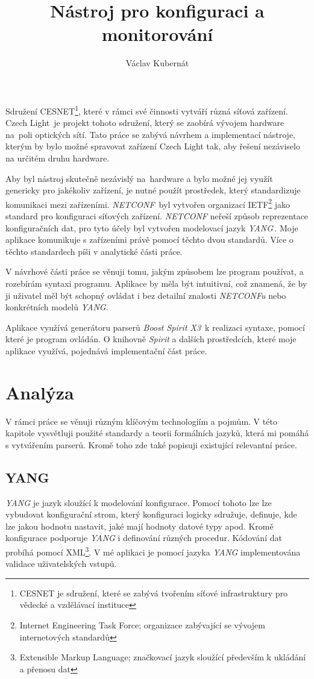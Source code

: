 \documentclass[thesis=B,czech,hidelinks]{FITthesis}[2019/03/06]
\title{Nástroj pro konfiguraci a monitorování}
\author{Václav Kubernát}
\begin{document}
\begin{introduction}
Sdružení CESNET\footnote{CESNET je sdružení, které se zabývá tvořením síťové infrastruktury pro vědecké a vzdělávací instituce}, které v rámci své činnosti vytváří různá síťová zařízení. Czech Light\,\cite{czechlight} je projekt tohoto sdružení, který se zaobírá vývojem hardware na~poli optických sítí. Tato práce se zabývá návrhem a implementací nástroje, kterým by bylo možné spravovat zařízení Czech Light tak, aby řešení nezáviselo na určitém druhu hardware.

Aby byl nástroj skutečně nezávislý na~hardware a bylo možné jej využít genericky pro jakékoliv zařízení, je nutné použít prostředek, který standardizuje komunikaci mezi zařízeními. \textit{NETCONF}\,\cite{rfcNetconf} byl vytvořen organizací IETF\footnote{Internet Engineering Task Force; organizace zabývající se vývojem internetových standardů} jako standard pro konfiguraci síťových zařízení. \textit{NETCONF} neřeší způsob reprezentace konfiguračních dat, pro tyto účely byl vytvořen modelovací jazyk \textit{YANG}\,\cite{rfcYang}. Moje aplikace komunikuje s zařízeními právě pomocí těchto dvou standardů. Více o těchto standardech píši v analytické části práce.

V návrhové části práce se věnuji tomu, jakým způsobem lze program používat, a rozebírám syntaxi programu. Aplikace by měla být intuitivní, což znamená, že by ji uživatel měl být schopný ovládat i bez detailní znalosti \textit{NETCONFu} nebo konkrétních modelů \textit{YANG}.

 Aplikace využívá generátoru parserů \textit{Boost Spirit X3}\,\cite{boost:spirit} k realizaci syntaxe, pomocí které je program ovládán. O knihovně \textit{Spirit} a dalších prostředcích, které moje aplikace využívá, pojednává implementační část práce.
\end{introduction}

\chapter{Analýza}
V rámci práce se věnuji různým klíčovým technologiím a pojmům. V této kapitole vysvětluji použité standardy a teorii formálních jazyků, která mi pomáhá s vytvářením parserů. Kromě toho zde také popisuji existující relevantní práce.


\section{YANG}
\textit{YANG} je jazyk sloužící k modelování konfigurace. Pomocí tohoto lze lze vybudovat konfigurační strom, který konfiguraci logicky sdružuje, definuje, kde lze jakou hodnotu nastavit, jaké mají hodnoty datové typy apod. Kromě konfigurace podporuje \textit{YANG} i definování různých procedur. Kódování dat probíhá pomocí XML\footnote{Extensible Markup Language; značkovací jazyk sloužící především k ukládání a přenosu dat}\@. V mé aplikaci je pomocí jazyka \textit{YANG} implementována validace uživatelských vstupů.
\end{document}
